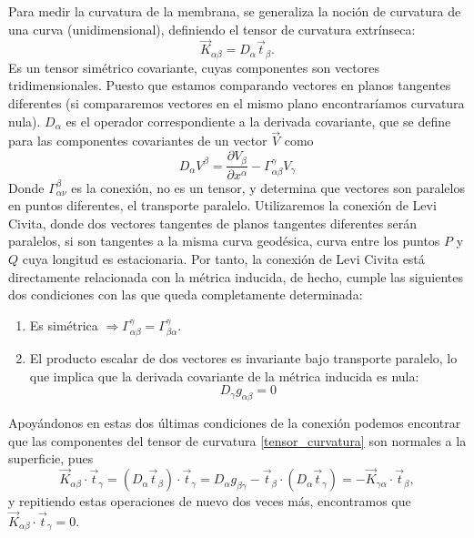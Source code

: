 Para medir la curvatura de la membrana, se generaliza la noción de curvatura
de una curva (unidimensional), definiendo el tensor de curvatura extrínseca:
\begin{equation}\label{tensor_curvatura}
\vec{K}_{\alpha\beta}=D_{\alpha}\vec{t}_{\beta}.
\end{equation}
Es un tensor simétrico covariante, cuyas componentes son vectores
tridimensionales. Puesto que estamos comparando vectores en planos tangentes
diferentes (si compararemos vectores en el mismo plano encontraríamos
curvatura nula). $D_{\alpha}$ es el operador correspondiente a la derivada
covariante, que se define para las componentes covariantes de un vector $\vec{V}$ como
\begin{equation}\label{derivada_covariante}
D_{\alpha}V^{\beta}=\frac{\partial V_{\beta}}{\partial x^{\alpha}}-\Gamma^{\gamma}_{\alpha\beta}V_{\gamma}
\end{equation}
Donde $\Gamma^{\beta}_{\alpha\nu}$ es la conexión, no es un tensor, y
determina que vectores son paralelos en puntos diferentes, el transporte
paralelo. Utilizaremos la conexión de Levi Civita, donde dos vectores
tangentes de planos tangentes diferentes serán paralelos, si son tangentes a la
misma curva geodésica, curva entre los puntos $P$ y $Q$ cuya longitud es
estacionaria. Por tanto, la conexión de Levi Civita está directamente
relacionada con la métrica inducida, de hecho, cumple las siguientes dos condiciones
con las que queda completamente determinada:
\begin{enumerate}
\item Es simétrica $\Rightarrow
  \Gamma^{\gamma}_{\alpha\beta}=\Gamma^{\gamma}_{\beta\alpha}$.
\item El producto escalar de dos vectores es invariante bajo transporte
  paralelo, lo que implica que la derivada covariante de la métrica inducida
  es nula: 
  \begin{equation}
    D_{\gamma}g_{\alpha\beta}=0
  \end{equation}
\end{enumerate}

Apoyándonos en estas dos últimas condiciones de la conexión podemos encontrar que
las componentes del tensor de curvatura \eqref{tensor_curvatura} son normales
a la superficie, pues
\begin{equation}
\vec{K}_{\alpha\beta}\cdot \vec{t}_{\gamma}=(D_{\alpha}\vec{t}_{\beta})\cdot\vec{t}_{\gamma}=D_{\alpha}g_{\beta\gamma}-\vec{t}_{\beta}\cdot(D_{\alpha}\vec{t}_{\gamma})=-\vec{K}_{\gamma\alpha}\cdot \vec{t}_{\beta},
\end{equation}
y repitiendo estas operaciones de nuevo dos veces más, encontramos que
$\vec{K}_{\alpha\beta}\cdot \vec{t}_{\gamma}=0$. 

